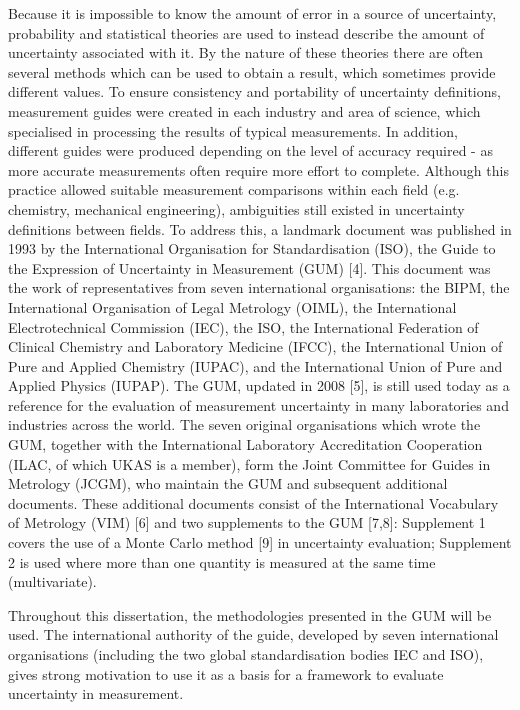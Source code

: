 \documentclass[../thesis.tex]{subfiles}
\begin{document}
\begin{refsection}
Because it is impossible to know the amount of error in a source of uncertainty, probability and statistical theories are used to instead describe the amount of uncertainty associated with it. By the nature of these theories there are often several methods which can be used to obtain a result, which sometimes provide different values. To ensure consistency and portability of uncertainty definitions, measurement guides were created in each industry and area of science, which specialised in processing the results of typical measurements. In addition, different guides were produced depending on the level of accuracy required - as more accurate measurements often require more effort to complete. Although this practice allowed suitable measurement comparisons within each field (e.g. chemistry, mechanical engineering), ambiguities still existed in uncertainty definitions between fields. To address this, a landmark document was published in 1993 by the International Organisation for Standardisation (ISO), the Guide to the Expression of Uncertainty in Measurement (GUM) [4]. This document was the work of representatives from seven international organisations: the BIPM, the International Organisation of Legal Metrology (OIML), the International Electrotechnical Commission (IEC), the ISO, the International Federation of Clinical Chemistry and Laboratory Medicine (IFCC), the International Union of Pure and Applied Chemistry (IUPAC), and the International Union of Pure and Applied Physics (IUPAP). The GUM, updated in 2008 [5], is still used today as a reference for the evaluation of measurement uncertainty in many laboratories and industries across the world. The seven original organisations which wrote the GUM, together with the International Laboratory Accreditation Cooperation (ILAC, of which UKAS is a member), form the Joint Committee for Guides in Metrology (JCGM), who maintain the GUM and subsequent additional documents. These additional documents consist of the International Vocabulary of Metrology (VIM) [6] and two supplements to the GUM [7,8]: Supplement 1 covers the use of a Monte Carlo method [9] in uncertainty evaluation; Supplement 2 is used where more than one quantity is measured at the same time (multivariate).

Throughout this dissertation, the methodologies presented in the GUM will be used. The international authority of the guide, developed by seven international organisations (including the two global standardisation bodies IEC and ISO), gives strong motivation to use it as a basis for a framework to evaluate uncertainty in measurement.


\end{refsection}
\end{document}
